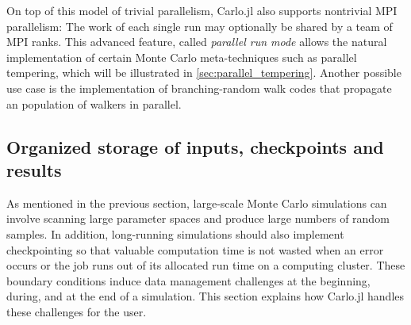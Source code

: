 \documentclass{SciPost}
\begin{document}
On top of this model of trivial parallelism, Carlo.jl also supports nontrivial MPI parallelism: The work of each single run may optionally be shared by a team of MPI ranks. This advanced feature, called \textit{parallel run mode} allows the natural implementation of certain Monte Carlo meta-techniques such as parallel tempering, which will be illustrated in \cref{sec:parallel_tempering}. Another possible use case is the implementation of branching-random walk codes that propagate an population of walkers in parallel.
\subsection{Organized storage of inputs, checkpoints and results}
As mentioned in the previous section, large-scale Monte Carlo simulations can involve scanning large parameter spaces and produce large numbers of random samples. In addition, long-running simulations should also implement checkpointing so that valuable computation time is not wasted when an error occurs or the job runs out of its allocated run time on a computing cluster. 
These boundary conditions induce data management challenges at the beginning, during, and at the end of a simulation. This section explains how Carlo.jl handles these challenges for the user.
\end{document}
